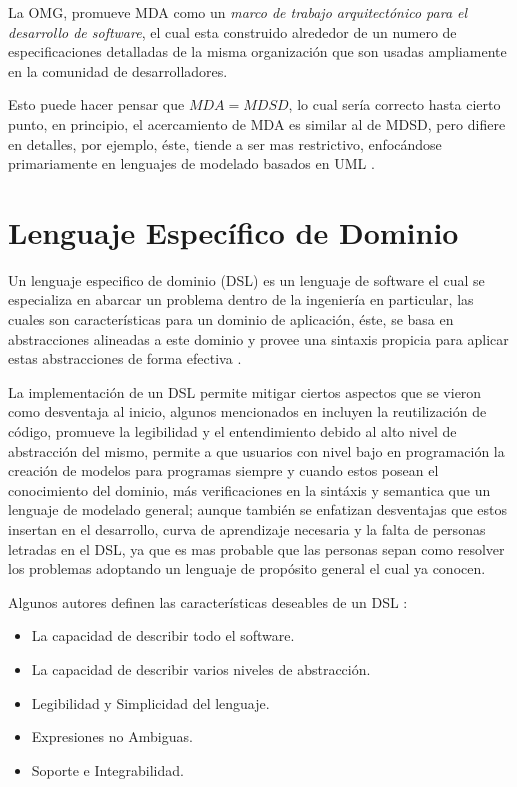 La OMG, promueve MDA como un \textit{marco de trabajo arquitectónico para el
desarrollo de software}, el cual esta construido alrededor de un numero de
especificaciones detalladas de la misma organización que son usadas ampliamente
en la comunidad de desarrolladores.

Esto puede hacer pensar que $MDA=MDSD$, lo cual sería correcto hasta cierto
punto, en principio, el acercamiento de MDA es similar al de MDSD, pero difiere
en detalles, por ejemplo, éste, tiende a ser mas restrictivo, enfocándose
primariamente en lenguajes de modelado basados en UML \cite{mdsd}.


\section{Lenguaje Específico de Dominio}
\label{sec:dsl}
Un lenguaje especifico de dominio (DSL) es un lenguaje de software el cual se
especializa en abarcar un problema dentro de la ingeniería en particular, las
cuales son características para un dominio de aplicación, éste, se basa en
abstracciones alineadas a este dominio y provee una sintaxis propicia para
aplicar estas abstracciones de forma efectiva \cite{sobernig2015}.

La implementación de un DSL permite mitigar ciertos aspectos que se vieron como
desventaja al inicio, algunos mencionados en \cite{nguyen2014} incluyen la
reutilización de código, promueve la legibilidad y el entendimiento debido al alto
nivel de abstracción del mismo, permite a que usuarios con nivel bajo en
programación la creación de modelos para programas siempre y cuando estos
posean el conocimiento del dominio, más verificaciones en la sintáxis y
semantica que un lenguaje de modelado general; aunque también se enfatizan
desventajas que estos insertan en el desarrollo, curva de aprendizaje
necesaria y la falta de personas letradas en el DSL, ya que es mas probable que
las personas sepan como resolver los problemas adoptando un lenguaje de
propósito general el cual ya conocen.

Algunos autores definen las características deseables de un DSL
\cite{mazanec2012}:
\begin{itemize}
	\item La capacidad de describir todo el software.
	\item La capacidad de describir varios niveles de abstracción.
	\item Legibilidad y Simplicidad del lenguaje.
	\item Expresiones no Ambiguas.
	\item Soporte e Integrabilidad.
\end{itemize}

